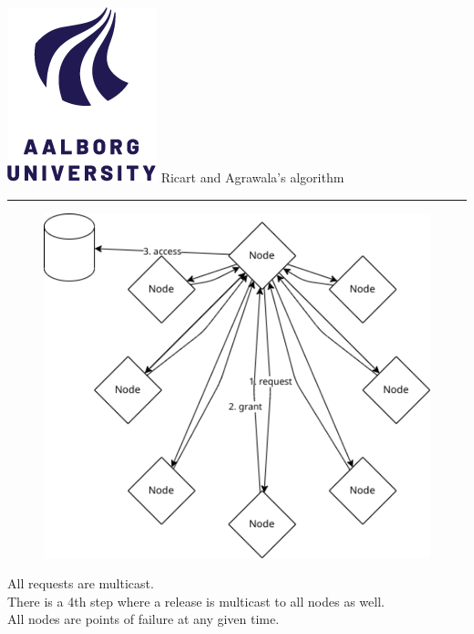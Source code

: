 \documentclass[aspectratio=1610,17pt,utf8]{beamer}
\newcommand{\regularframe}[1]{\color{black}\includegraphics[width=.05\textwidth]{figures/aau.png} #1\\\hrule}
\begin{document}
\begin{frame}{\regularframe{Ricart and Agrawala's algorithm}}
    \begin{minipage}{.45\textwidth}
        \begin{figure}
            \includegraphics[width=\textwidth]{figures/1-ricart-agrawala.png}
        \end{figure}
    \end{minipage}
    \begin{minipage}{.5\textwidth}
        \tiny{All requests are multicast.\\There is a 4th step where a release is multicast to all nodes as well.\\All nodes are points of failure at any given time.}
    \end{minipage}
\end{frame}
\end{document}
